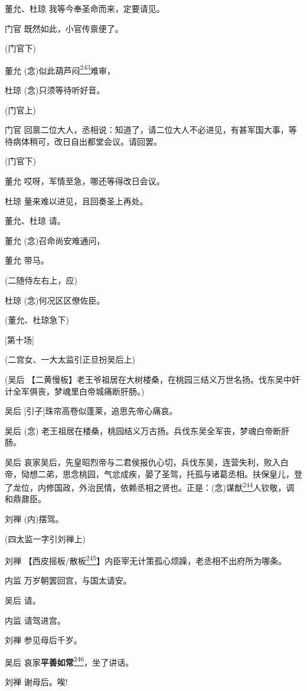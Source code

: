 董允、杜琼 我等今奉圣命而来，定要请见。

门官 既然如此，小官传禀便了。

(门官下)

董允
(念)似此葫芦闷\protect\hyperlink{fn243}{\textsuperscript{243}}难审，

杜琼 (念)只须等待听好音。

(门官上)

门官
回禀二位大人，丞相说：知道了，请二位大人不必进见，有甚军国大事，等待病体稍可，改日自出都堂会议。请回罢。

(门官下)

董允 哎呀，军情至急，哪还等得改日会议。

杜琼 量来难以进见，且回奏圣上再处。

董允、杜琼 请。

董允 (念)召命尚安难通问，

董允 带马。

(二随侍左右上，应)

杜琼 (念)何况区区僚佐臣。

(董允、杜琼急下)

{[}第十场{]}

(二宫女、一大太监引正旦扮吴后上)

(吴后
【二黄慢板】老王爷祖居在大树楼桑，在桃园三结义万世名扬。伐东吴中奸计全军俱丧，梦魂里白帝城痛断肝肠。)

吴后 {[}引子{]}珠帘高卷似蓬莱，追思先帝心痛哀。

吴后 (念)
老王祖居在楼桑，桃园结义万古扬。兵伐东吴全军丧，梦魂白帝断肝肠。

吴后
哀家吴后，先皇昭烈帝与二君侯报仇心切，兵伐东吴，连营失利，败入白帝，恸想二弟，思念桃园，气忿成疾，晏了圣驾，托孤与诸葛丞相。扶保皇儿，登了龙位，内修国政，外治民情，依赖丞相之贤也。正是：(念)谋猷\protect\hyperlink{fn244}{\textsuperscript{244}}人钦敬，调和鼎鼐臣。

刘禅 (内)摆驾。

(四太监一字引刘禅上)

刘禅
【西皮摇板/散板\protect\hyperlink{fn245}{\textsuperscript{245}}】内臣宰无计策孤心烦躁，老丞相不出府所为哪条。

内监 万岁朝罢回宫，与国太请安。

吴后 请。

内监 请驾进宫。

刘禅 参见母后千岁。

吴后
哀家\textbf{平善如常}\protect\hyperlink{fn246}{\textsuperscript{246}}，坐了讲话。

刘禅 谢母后。唉!

